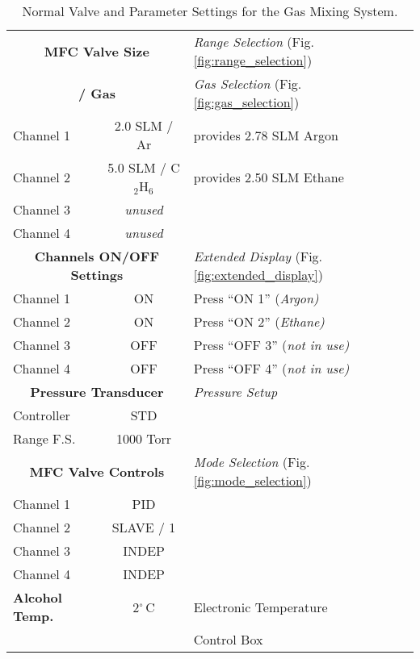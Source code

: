 {\begin{table}[hbt]
\begin{minipage}[h!]{\textwidth}
{\begin{center}
\begin{tabular}{|l|c|l|}
\multicolumn{2}{|c|}{\bf MFC Valve Size } & {\it Range Selection} (Fig. \ref{fig:range_selection})  \\
\multicolumn{2}{|c|}{\bf  / Gas}             & {\it Gas Selection} (Fig. \ref{fig:gas_selection})  \\
Channel 1   & 2.0 SLM / Ar         & provides 2.78 SLM Argon\\
Channel 2   & 5.0 SLM / C$_2$H$_6$ & provides 2.50 SLM Ethane\\
Channel 3   & \it unused&                  \\
Channel 4   & \it unused&                  \\ \hline
\multicolumn{2}{|c|}{\bf Channels ON/OFF Settings} & {\it Extended Display} (Fig. \ref{fig:extended_display})   \\
Channel 1   & ON       &                   Press ``ON 1'' (\em Argon)  \\
Channel 2   & ON       &                   Press ``ON 2'' (\em Ethane) \\
Channel 3   & OFF      &                   Press ``OFF 3'' (\em not in use) \\
Channel 4   & OFF      &                   Press ``OFF 4'' (\em not in use) \\ \hline
\multicolumn{2}{|c|}{\bf Pressure Transducer} & {\it Pressure Setup}  \\
Controller  & STD      &                   \\
Range F.S.  & 1000 Torr&                   \\ \hline
\multicolumn{2}{|c|}{\bf MFC Valve Controls     } & {\it Mode Selection} (Fig. \ref{fig:mode_selection}) \\
Channel 1   & PID      &                                   \\
Channel 2   & SLAVE / 1&                                   \\
Channel 3   & INDEP    &                                   \\
Channel 4   & INDEP    &                                   \\ \hline
\bf Alcohol Temp. & 2$^\circ$\,C & Electronic Temperature  \\
                  &              & Control Box             \\ \hline
\hline
\end{tabular}
\end{center}
}%
\end{minipage}
\caption{Normal Valve and Parameter Settings for the Gas Mixing System.
\label{tab:mixer_nominals}}
\end{table}
}
